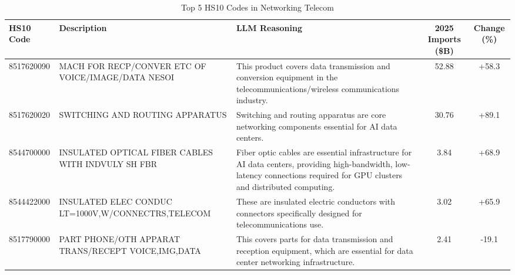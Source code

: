 \begin{table}[htbp]
\centering
\small
\caption{Top 5 HS10 Codes in Networking Telecom}
\label{tab:top5_networking_telecom}
\setlength{\tabcolsep}{1.25mm}
\renewcommand{\arraystretch}{1.80}
\begin{tabular}{lp{3.5cm}p{3.5cm}cc}
\toprule
HS10 Code & Description & LLM Reasoning & 2025 Imports (\$B) & Change (\%) \\
\midrule
8517620090 & {\footnotesize MACH FOR RECP/CONVER ETC OF VOICE/IMAGE/DATA NESOI} & {\footnotesize This product covers data transmission and conversion equipment in the telecommunications/wireless communications industry.} & 52.88 & +58.3 \\
8517620020 & {\footnotesize SWITCHING AND ROUTING APPARATUS} & {\footnotesize Switching and routing apparatus are core networking components essential for AI data centers.} & 30.76 & +89.1 \\
8544700000 & {\footnotesize INSULATED OPTICAL FIBER CABLES WITH INDVULY SH FBR} & {\footnotesize Fiber optic cables are essential infrastructure for AI data centers, providing high-bandwidth, low-latency connections required for GPU clusters and distributed computing.} & 3.84 & +68.9 \\
8544422000 & {\footnotesize INSULATED ELEC CONDUC LT=1000V,W/CONNECTRS,TELECOM} & {\footnotesize These are insulated electric conductors with connectors specifically designed for telecommunications use.} & 3.02 & +65.9 \\
8517790000 & {\footnotesize PART PHONE/OTH APPARAT TRANS/RECEPT VOICE,IMG,DATA} & {\footnotesize This covers parts for data transmission and reception equipment, which are essential for data center networking infrastructure.} & 2.41 & -19.1 \\
\bottomrule
\end{tabular}
\end{table}

